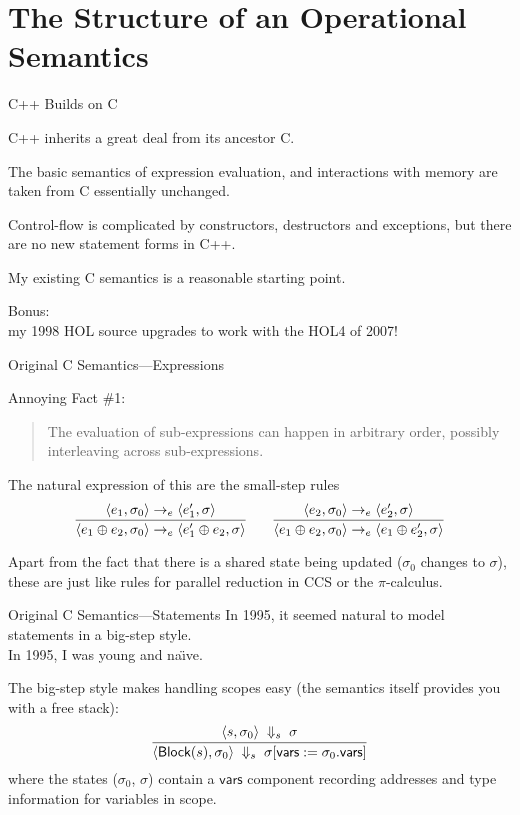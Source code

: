 \documentclass[compress,dvips,color=usenames,xcolor=dvipsnames]{beamer}
\newcommand{\cpp}{\mbox{C\hspace{-.1em}+\hspace{-.05em}+}}
\begin{document}
\section{The Structure of an Operational Semantics}
\begin{frame}{\cpp{} Builds on C}

\cpp{} inherits a great deal from its ancestor C.

\bigskip
The basic semantics of expression evaluation, and interactions with
memory are taken from C essentially unchanged.

\bigskip
Control-flow is complicated by constructors, destructors and
exceptions, but there are no new statement forms in \cpp.

\bigskip My existing C semantics is a reasonable starting point.

\bigskip \footnotesize
Bonus:\\
\quad my 1998 HOL source upgrades to work with the HOL4 of 2007!

\end{frame}

\begin{frame}{Original C Semantics---Expressions}

Annoying Fact \#1:
\begin{quote}
   The evaluation of sub-expressions can happen in arbitrary order,
   possibly interleaving across sub-expressions.
\end{quote}

\bigskip
The natural expression of this are the small-step rules
\[
\infer{
  \langle e_1 \oplus e_2, \sigma_0\rangle \rightarrow_e
  \langle e_1' \oplus e_2, \sigma\rangle
}{
  \langle e_1, \sigma_0\rangle \rightarrow_e \langle e_1',\sigma\rangle
} \qquad
\infer{
  \langle e_1 \oplus e_2, \sigma_0\rangle \rightarrow_e
  \langle e_1 \oplus e_2', \sigma\rangle
}{
  \langle e_2, \sigma_0\rangle \rightarrow_e \langle e_2',\sigma\rangle
}
\]

\bigskip Apart from the fact that there is a shared state being
updated ($\sigma_0$ changes to $\sigma$), these are just like rules
for parallel reduction in CCS or the $\pi$-calculus.
\end{frame}

\begin{frame}{Original C Semantics---Statements}
  In 1995, it seemed natural to model statements in a big-step
  style.\\
  In 1995, I was young and na\"\i{}ve.

\bigskip
The big-step style makes handling scopes easy (the semantics itself
provides you with a free stack):
\[
\infer{
  \langle \textsf{Block}(s), \sigma_0\rangle
  \;\Downarrow_s\;
  \sigma[\textsf{vars} := \sigma_0.\textsf{vars}]
}{
  \langle s, \sigma_0\rangle \;\Downarrow_s\; \sigma
}
\]
where the states ($\sigma_0$, $\sigma$) contain a $\textsf{vars}$
component recording addresses and type information for variables in
scope.

\end{frame}
\end{document}

